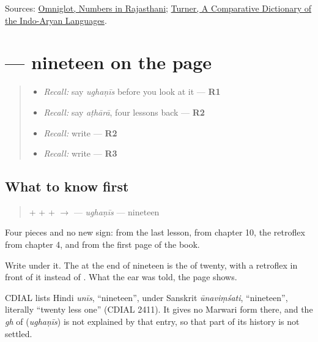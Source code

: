 \begin{tcolorbox}[breakable,colback=teal!4,colframe=teal!35!black,title={Before you move on}]
Sources: \href{https://www.omniglot.com/language/numbers/rajasthani.htm}{Omniglot, Numbers in Rajasthani}; \href{https://dsal.uchicago.edu/dictionaries/soas/}{Turner, A Comparative Dictionary of the Indo-Aryan Languages}.
\end{tcolorbox}
\section[\texorpdfstring{\mw{उघणीस} (ughaṇīs)}{उघणीस (ughaṇīs)}]{ — nineteen on the page}

\label{lesson:MW-C38-ughanis}



\begin{quote}
\begin{itemize}
\raggedright
  \item \emph{Recall:} say \emph{ughaṇīs} before you look at it — \textbf{R1}
  \item \emph{Recall:} say \emph{aṭhārā}, four lessons back — \textbf{R2}
  \item \emph{Recall:} write \textbf{} — \textbf{R2}
  \item \emph{Recall:} write \textbf{} — \textbf{R3}
\end{itemize}
\end{quote}

\subsection*{What to know first}
\begin{quote}
\textbf{} + \textbf{} + \textbf{} + \textbf{} $\to$ \textbf{} — \emph{ughaṇīs} — nineteen
\end{quote}

Four pieces and no new sign: \textbf{} from the last lesson, \textbf{} from chapter 10, the retroflex \textbf{} from chapter 4, and \textbf{} from the first page of the book.

Write \textbf{} under it. The \textbf{} at the end of nineteen is the \textbf{} of twenty, with a retroflex \textbf{} in front of it instead of \textbf{}. What the ear was told, the page shows.

\begin{cousinweb}
CDIAL lists Hindi \emph{unīs}, \textquotedblleft{}nineteen\textquotedblright{}, under Sanskrit \emph{ūnaviṃśati}, \textquotedblleft{}nineteen\textquotedblright{}, literally \textquotedblleft{}twenty less one\textquotedblright{} (CDIAL 2411). It gives no Marwari form there, and the \emph{gh} of \textbf{} (\emph{ughaṇīs}) is not explained by that entry, so that part of its history is not settled.
\end{cousinweb}

